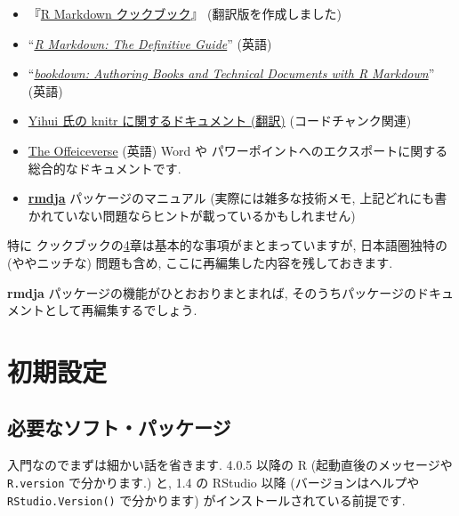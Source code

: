 \documentclass[
]{ltjsarticle}
\providecommand{\tightlist}{%
  \setlength{\itemsep}{0pt}\setlength{\parskip}{0pt}}
\begin{document}
\begin{itemize}
\tightlist
\item
  \citet{xie2020Markdowna}『\href{https://gedevan-aleksizde.github.io/rmarkdown-cookbook/}{R Markdown クックブック}』 (翻訳版を作成しました)
\item
  \citet{xie2019Markdown} ``\href{https://bookdown.org/yihui/rmarkdown/markdown-syntax.html}{\emph{R Markdown: The Definitive Guide}}'' (英語)
\item
  \citet{R-bookdown} ``\href{https://bookdown.org/yihui/bookdown/}{\emph{bookdown: Authoring Books and Technical Documents with R Markdown}}'' (英語)
\item
  \href{https://gedevan-aleksizde.github.io/knitr-doc-ja/index.html}{Yihui 氏の knitr に関するドキュメント (翻訳)} (コードチャンク関連)
\item
  \href{https://ardata-fr.github.io/officeverse/}{The Offeiceverse} (英語) Word や パワーポイントへのエクスポートに関する総合的なドキュメントです.
\item
  \href{https://github.com/Gedevan-Aleksizde/rmdja}{\textbf{rmdja}} パッケージのマニュアル (実際には雑多な技術メモ, 上記どれにも書かれていない問題ならヒントが載っているかもしれません)
\end{itemize}

特に クックブックの\href{https://gedevan-aleksizde.github.io/rmarkdown-cookbook/document-elements.html}{4}章は基本的な事項がまとまっていますが, 日本語圏独特の (ややニッチな) 問題も含め, ここに再編集した内容を残しておきます.

\textbf{rmdja} パッケージの機能がひとおおりまとまれば, そのうちパッケージのドキュメントとして再編集するでしょう.

\hypertarget{setup}{%
\section{初期設定}\label{setup}}

\hypertarget{ux5fc5ux8981ux306aux30bdux30d5ux30c8ux30d1ux30c3ux30b1ux30fcux30b8}{%
\subsection{必要なソフト・パッケージ}\label{ux5fc5ux8981ux306aux30bdux30d5ux30c8ux30d1ux30c3ux30b1ux30fcux30b8}}

入門なのでまずは細かい話を省きます. 4.0.5 以降の R (起動直後のメッセージや \texttt{R.version} で分かります.) と, 1.4 の RStudio 以降 (バージョンはヘルプや \texttt{RStudio.Version()} で分かります) がインストールされている前提です.
\end{document}
